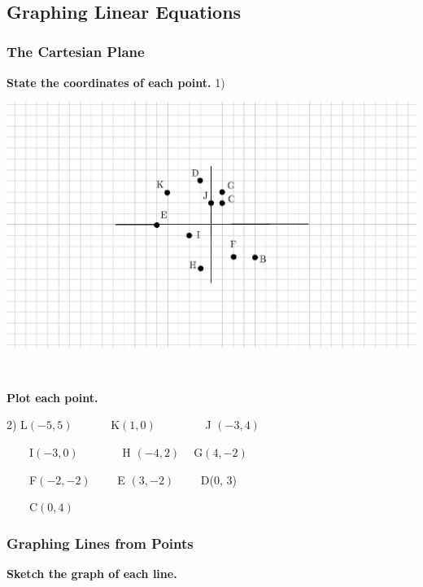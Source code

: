 \documentclass[11pt]{book}
\newcommand{\tmstrong}[1]{\textbf{#1}}
\theoremstyle{definition}  %
\begin{document}
\vspace{3in}
~

\pagebreak

\subsection{Graphing Linear Equations}\par


\subsubsection{The Cartesian Plane}\par

{\tmstrong{State the coordinates of each point.}}
1)
\begin{multicols}{2}
  \includegraphics[scale=1,bb = 115 65 310 190, clip=true]{II_1_3bp-1.eps}
\end{multicols}

\

{\tmstrong{Plot each point.}}

2) L$(- 5, 5)$ \ \ \ \ \ \ K$(1, 0)$ \ \ \ \ \ \ \ \ J $(- 3, 4)$

\ \ \ \ I$(- 3, 0)$ \ \ \ \ \ \ \ H $(- 4, 2) \ \ \ \ $ G$(4, -2)$

\ \ \ \ F$(- 2, - 2)$ \ \ \ \ E $(3, - 2)$ \ \ \ \ D(0, 3)

\ \ \ \ C$(0, 4)$

\subsubsection{Graphing Lines from Points}\par

{\tmstrong{Sketch the graph of each line.}}
\end{document}
